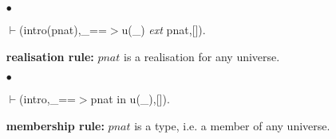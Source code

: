 \documentclass[11pt]{report}
\begin{document}
 \begin{enumerate}
 \item[$\bullet$]
\begin{sf}\begin{tabbing}
$\vdash$(intro(pnat),\_\hspace{0.1em}==$>$u(\_\hspace{0.1em}) \mbox{\it ext} pnat,[]).
\end{tabbing}\end{sf}

 {\bf realisation rule:} $pnat$ is a realisation for any universe.
  
 \item[$\bullet$]
\begin{sf}\begin{tabbing}
$\vdash$(intro,\_\hspace{0.1em}==$>$pnat in u(\_\hspace{0.1em}),[]).
\end{tabbing}\end{sf}

 {\bf membership rule:} $pnat$ is a type, i.e. a member 
 of any universe.
 \end{enumerate}
  
\end{document}
